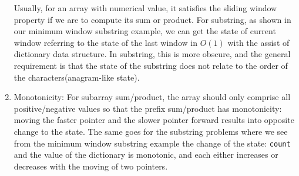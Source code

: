 \documentclass[../main.tex]{subfiles}
\begin{document}
\begin{enumerate}
    Usually, for an array with numerical value, it satisfies the sliding window property if we are to compute its sum or product. For substring, as shown in our minimum window substring example, we can get the state of current window referring to the state of the last window in $O(1)$ with the assist of dictionary data structure. In substring, this is more obscure, and the general requirement is that the state of the substring does not relate to the order of the characters(anagram-like state). 
    
    \item Monotonicity: For subarray sum/product, the array should only comprise all positive/negative values so that the prefix sum/product has monotonicity: moving the faster pointer and the slower pointer forward results into opposite change to the state.  The same goes for the substring problems where we see from the minimum window substring example the change of the state: \texttt{count} and the value of the dictionary is monotonic, and each either increases or decreases with the moving of two pointers.
\end{enumerate}

\end{document}
